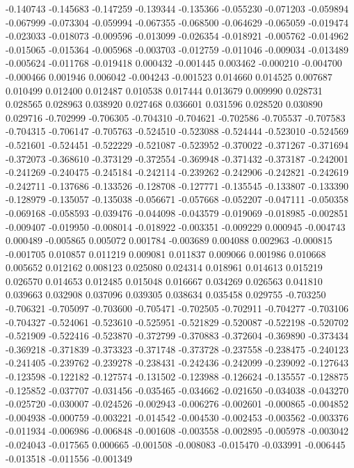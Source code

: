 -0.140743
-0.145683
-0.147259
-0.139344
-0.135366
-0.055230
-0.071203
-0.059894
-0.067999
-0.073304
-0.059994
-0.067355
-0.068500
-0.064629
-0.065059
-0.019474
-0.023033
-0.018073
-0.009596
-0.013099
-0.026354
-0.018921
-0.005762
-0.014962
-0.015065
-0.015364
-0.005968
-0.003703
-0.012759
-0.011046
-0.009034
-0.013489
-0.005624
-0.011768
-0.019418
0.000432
-0.001445
0.003462
-0.000210
-0.004700
-0.000466
0.001946
0.006042
-0.004243
-0.001523
0.014660
0.014525
0.007687
0.010499
0.012400
0.012487
0.010538
0.017444
0.013679
0.009990
0.028731
0.028565
0.028963
0.038920
0.027468
0.036601
0.031596
0.028520
0.030890
0.029716
-0.702999
-0.706305
-0.704310
-0.704621
-0.702586
-0.705537
-0.707583
-0.704315
-0.706147
-0.705763
-0.524510
-0.523088
-0.524444
-0.523010
-0.524569
-0.521601
-0.524451
-0.522229
-0.521087
-0.523952
-0.370022
-0.371267
-0.371694
-0.372073
-0.368610
-0.373129
-0.372554
-0.369948
-0.371432
-0.373187
-0.242001
-0.241269
-0.240475
-0.245184
-0.242114
-0.239262
-0.242906
-0.242821
-0.242619
-0.242711
-0.137686
-0.133526
-0.128708
-0.127771
-0.135545
-0.133807
-0.133390
-0.128979
-0.135057
-0.135038
-0.056671
-0.057668
-0.052207
-0.047111
-0.050358
-0.069168
-0.058593
-0.039476
-0.044098
-0.043579
-0.019069
-0.018985
-0.002851
-0.009407
-0.019950
-0.008014
-0.018922
-0.003351
-0.009229
0.000945
-0.004743
0.000489
-0.005865
0.005072
0.001784
-0.003689
0.004088
0.002963
-0.000815
-0.001705
0.010857
0.011219
0.009081
0.011837
0.009066
0.001986
0.010668
0.005652
0.012162
0.008123
0.025080
0.024314
0.018961
0.014613
0.015219
0.026570
0.014653
0.012485
0.015048
0.016667
0.034269
0.026563
0.041810
0.039663
0.032908
0.037096
0.039305
0.038634
0.035458
0.029755
-0.703250
-0.706321
-0.705097
-0.703600
-0.705471
-0.702505
-0.702911
-0.704277
-0.703106
-0.704327
-0.524061
-0.523610
-0.525951
-0.521829
-0.520087
-0.522198
-0.520702
-0.521909
-0.522416
-0.523870
-0.372799
-0.370883
-0.372604
-0.369890
-0.373434
-0.369218
-0.371839
-0.373323
-0.371748
-0.373728
-0.237558
-0.238475
-0.240123
-0.241405
-0.239762
-0.239278
-0.238431
-0.242436
-0.242099
-0.239092
-0.127643
-0.123598
-0.122182
-0.127574
-0.131502
-0.123988
-0.126624
-0.135557
-0.128875
-0.125852
-0.037707
-0.031456
-0.035465
-0.034662
-0.021650
-0.034038
-0.043270
-0.025720
-0.030007
-0.024526
-0.002943
-0.006276
-0.002601
-0.000865
-0.004852
-0.004938
-0.000759
-0.003221
-0.014542
-0.004530
-0.002453
-0.003562
-0.003376
-0.011934
-0.006986
-0.006848
-0.001608
-0.003558
-0.002895
-0.005978
-0.003042
-0.024043
-0.017565
0.000665
-0.001508
-0.008083
-0.015470
-0.033991
-0.006445
-0.013518
-0.011556
-0.001349
